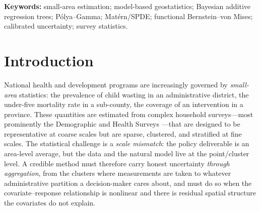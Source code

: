 \documentclass[11pt]{article}
\theoremstyle{remark}
\begin{document}
\noindent\textbf{Keywords:} small-area estimation; model-based geostatistics;
Bayesian additive regression trees; P\'olya--Gamma; Mat\'ern/SPDE; functional
Bernstein--von Mises; calibrated uncertainty; survey statistics.

\section{Introduction}\label{sec:intro}

National health and development programs are increasingly governed by
\emph{small-area} statistics: the prevalence of child wasting in an
administrative district, the under-five mortality rate in a sub-county, the
coverage of an intervention in a province. These quantities are estimated from
complex household surveys---most prominently the Demographic and Health Surveys
\citep[DHS;][]{dhs2014kenya}---that are designed to be representative at coarse
scales but are sparse,
clustered, and stratified at fine scales. The statistical challenge is a
\emph{scale mismatch}: the policy deliverable is an area-level average, but the
data and the natural model live at the point/cluster level. A credible method
must therefore carry honest uncertainty \emph{through aggregation}, from the
clusters where measurements are taken to whatever administrative partition a
decision-maker cares about, and must do so when the covariate--response
relationship is nonlinear and there is residual spatial structure the covariates
do not explain.
\end{document}
